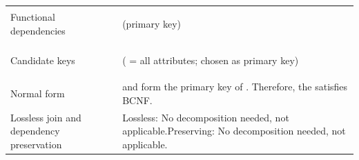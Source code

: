 \begin{xltabular}{\linewidth}{@{}KY@{}}
Functional dependencies & \begin{points}
  \item {} (primary key)
\end{points} \\
Candidate keys & \begin{points}
  \item {} ( = all attributes; chosen as primary key)
\end{points} \\
Normal form &  and  form the primary key of . Therefore, the  satisfies BCNF. \\
Lossless join and dependency preservation & Lossless: No decomposition needed, not applicable.\newline Preserving: No decomposition needed, not applicable. \\
\bottomrule
\end{xltabular}

